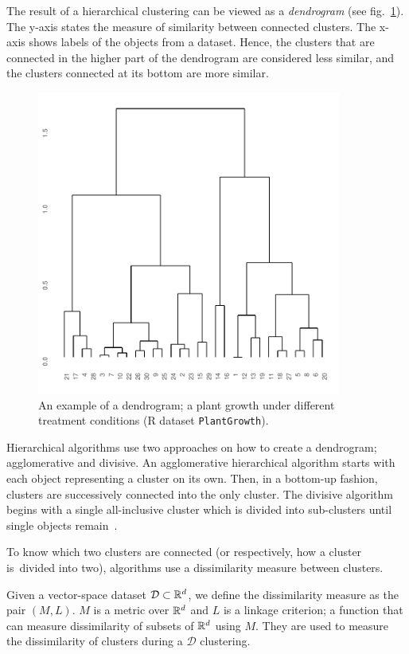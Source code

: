 The result of a hierarchical clustering can be viewed as a \emph{dendrogram} (see fig.~\ref{fig01:dendro}). The y-axis states the measure of similarity between connected clusters. The x-axis shows labels of the objects from a dataset. Hence, the clusters that are connected in the higher part of the dendrogram are considered less similar, and the clusters connected at its bottom are more similar. 

\begin{figure}[t]
	\centering
	\includegraphics[width=10cm]{img/dendro}
	\caption{An example of a dendrogram; a plant growth under different treatment conditions (R dataset \texttt{PlantGrowth}).}
	\label{fig01:dendro}
\end{figure}

Hierarchical algorithms use two approaches on how to create a dendrogram; agglomerative and divisive. An agglomerative hierarchical algorithm starts with each object representing a cluster on its own. Then, in a bottom-up fashion, clusters are successively connected into the only cluster. The divisive algorithm begins with a single all-inclusive cluster which is divided into sub-clusters until single objects remain~\cite{rokach2005clustering}. 



To know which two clusters are connected (or respectively, how a cluster is~divided into two), algorithms use a dissimilarity measure between clusters.  

\begin{defn}
	Given a vector-space dataset $\mathcal{D}\subset\mathbb{R}^d$,  we define the dissimilarity measure as the pair $(M,L)$. $M$ is a metric over $\mathbb{R}^d$ and $L$ is a linkage criterion; a function that can measure dissimilarity of subsets of $\mathbb{R}^d$ using $M$. They are used to measure the dissimilarity of clusters during a $\mathcal{D}$ clustering.
\end{defn}

